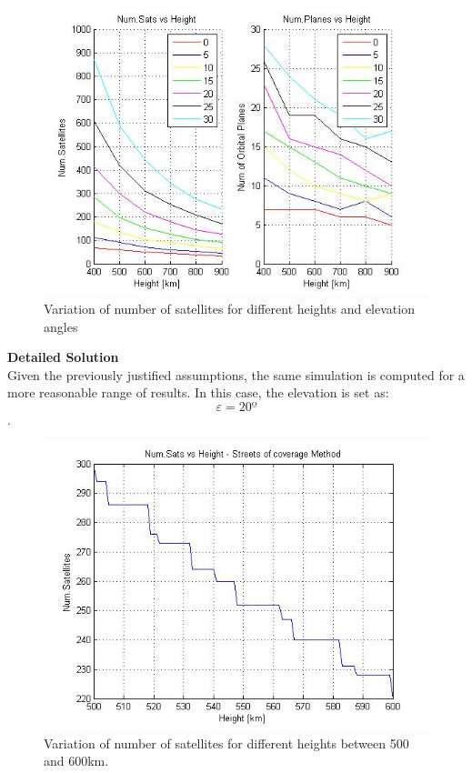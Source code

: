 \begin{figure}[H]
\begin{center}
\includegraphics[scale=0.7]{PolarOrbits/GeneralResults.jpg}
\caption{Variation of number of satellites for different heights and elevation angles}
\end{center}
\end{figure}

\textbf{Detailed Solution}\\
Given the previously justified assumptions, the same simulation is computed for a more reasonable range of results. In this case, the elevation is set as: $$\varepsilon = 20º$$.

\begin{figure}[H]
\begin{center}
\includegraphics[scale=0.7]{PolarOrbits/Polar.jpg}
\caption{Variation of number of satellites for different heights between 500 and 600km.}
\end{center}
\end{figure}

